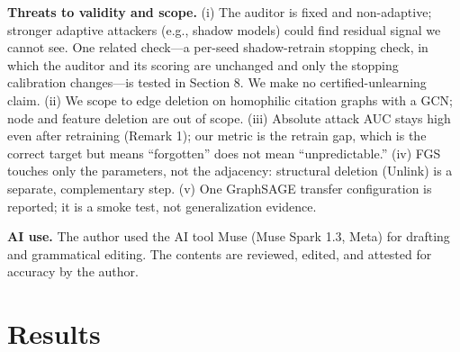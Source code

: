 \documentclass[pdflatex,sn-basic,Numbered]{sn-jnl}
\begin{document}
\textbf{Threats to validity and scope.} (i) The auditor is fixed and non-adaptive; stronger adaptive attackers (e.g., shadow models) could find residual signal we cannot see. One related check---a per-seed shadow-retrain stopping check, in which the auditor and its scoring are unchanged and only the stopping calibration changes---is tested in Section 8. We make no certified-unlearning claim. (ii) We scope to edge deletion on homophilic citation graphs with a GCN; node and feature deletion are out of scope. (iii) Absolute attack AUC stays high even after retraining (Remark 1); our metric is the retrain gap, which is the correct target but means ``forgotten'' does not mean ``unpredictable.'' (iv) FGS touches only the parameters, not the adjacency: structural deletion (Unlink) is a separate, complementary step. (v) One GraphSAGE transfer configuration is reported; it is a smoke test, not generalization evidence.

\textbf{AI use.} The author used the AI tool Muse (Muse Spark 1.3, Meta) for drafting and grammatical editing. The contents are reviewed, edited, and attested for accuracy by the author.

\section{Results}
\end{document}
